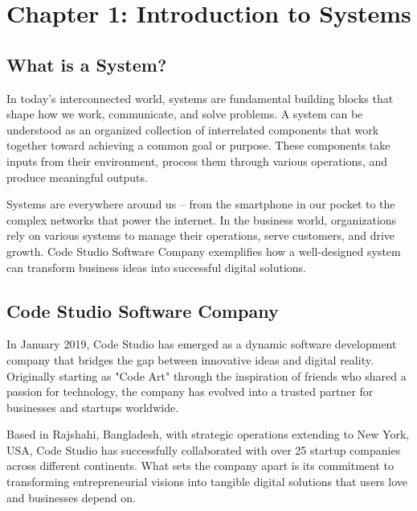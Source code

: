 \documentclass[12pt,a4paper]{article}
\begin{document}
\pagestyle{reportstyle}
\newpage

\tableofcontents
\newpage


\section{Chapter 1: Introduction to Systems}

\vspace{0.2cm}

\subsection{What is a System?}

In today's interconnected world, systems are fundamental building blocks that shape how we work, communicate, and solve problems. A system can be understood as an organized collection of interrelated components that work together toward achieving a common goal or purpose. These components take inputs from their environment, process them through various operations, and produce meaningful outputs.

Systems are everywhere around us – from the smartphone in our pocket to the complex networks that power the internet. In the business world, organizations rely on various systems to manage their operations, serve customers, and drive growth. Code Studio Software Company exemplifies how a well-designed system can transform business ideas into successful digital solutions.

\subsection{Code Studio Software Company}

In January 2019, Code Studio has emerged as a dynamic software development company that bridges the gap between innovative ideas and digital reality. Originally starting as "Code Art" through the inspiration of friends who shared a passion for technology, the company has evolved into a trusted partner for businesses and startups worldwide.

Based in Rajshahi, Bangladesh, with strategic operations extending to New York, USA, Code Studio has successfully collaborated with over 25 startup companies across different continents. What sets the company apart is its commitment to transforming entrepreneurial visions into tangible digital solutions that users love and businesses depend on.
\end{document}
